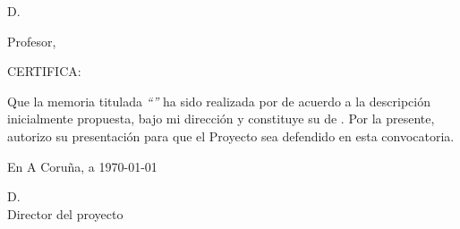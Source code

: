 %
%
\thispagestyle{plain}
\begin{center}
	\begin{minipage}[t][6cm][l]{.8\textwidth}
		\begin{center}
			D. {\sc \director}

			Profesor, \centro

			\departamento
			
			\universidad
		\end{center}
	\end{minipage}
\end{center}

CERTIFICA:

Que la memoria titulada {\it ``\titulo''} ha sido realizada por {\sc \autor}
de acuerdo a la descripción inicialmente propuesta, bajo mi dirección y
constituye su {\proyecto} de {\curso}.
Por la presente, autorizo su presentación para que el Proyecto sea defendido
en esta convocatoria.

\vspace{3cm}

En A Coruña, a \today

\vspace{3cm}
\begin{center}
	\begin{minipage}[t][4cm][l]{.5\textwidth}
	D. {\sc \director}
	\\
	Director del proyecto
	\end{minipage}
\end{center}
